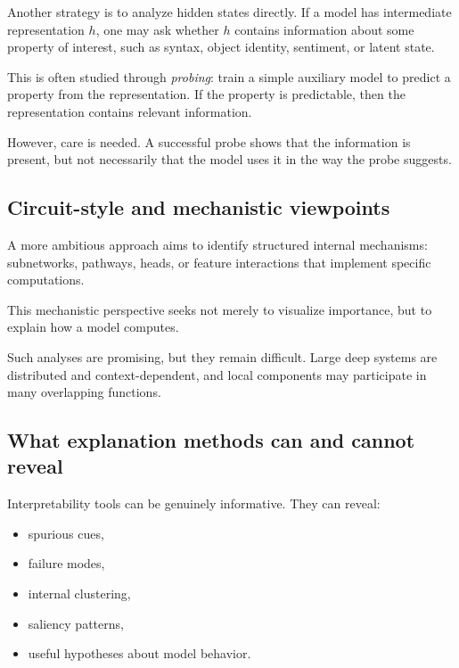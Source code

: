 Another strategy is to analyze hidden states directly.
If a model has intermediate representation \(h\), one may ask whether \(h\) contains information about some property of interest, such as syntax, object identity, sentiment, or latent state.

\medskip

This is often studied through \emph{probing}: train a simple auxiliary model to predict a property from the representation.
If the property is predictable, then the representation contains relevant information.

\medskip

However, care is needed.
A successful probe shows that the information is present, but not necessarily that the model uses it in the way the probe suggests.

\subsection*{Circuit-style and mechanistic viewpoints}

A more ambitious approach aims to identify structured internal mechanisms:
subnetworks, pathways, heads, or feature interactions that implement specific computations.

\medskip

This mechanistic perspective seeks not merely to visualize importance, but to explain how a model computes.

\medskip

Such analyses are promising, but they remain difficult.
Large deep systems are distributed and context-dependent, and local components may participate in many overlapping functions.

\subsection*{What explanation methods can and cannot reveal}

Interpretability tools can be genuinely informative.
They can reveal:
\begin{itemize}
    \item spurious cues,
    \item failure modes,
    \item internal clustering,
    \item saliency patterns,
    \item useful hypotheses about model behavior.
\end{itemize}

